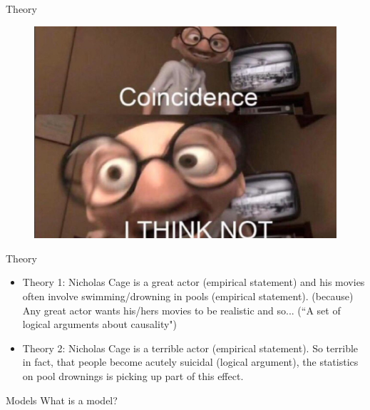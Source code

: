\documentclass{beamer}
\begin{document}
\begin{frame}{Theory}

	\begin{figure}[!htb]
		\includegraphics[width=\textwidth,keepaspectratio]{../img/coincidence.jpeg}
	\end{figure}
	
\end{frame}

\begin{frame}{Theory}

\begin{itemize}[<+- | alert@+>]

	\item Theory 1: Nicholas Cage is a great actor (empirical statement) and
		his movies often involve swimming/drowning in pools (empirical
		statement).  (because) Any great actor wants his/hers movies to
		be realistic and so... (``A set of logical arguments about
		causality")

	\item Theory 2: Nicholas Cage is a terrible actor (empirical statement).
		So terrible in fact, that people become acutely suicidal
		(logical argument), the statistics on pool drownings is picking
		up part of this effect.

\end{itemize}

\end{frame}

\begin{frame}{Models}
    What is a model?
\end{frame}
\end{document}
